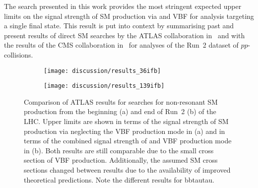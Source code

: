 The search presented in this work provides the most stringent expected
upper limits on the signal strength of SM \HH production via \ggF and
VBF for analysis targeting a single final state. This result is put
into context by summarising past and present results of direct SM \HH
searches by the ATLAS collaboration
in~ and with the results of the CMS
collaboration in~ for analyses of the Run~2
dataset of $pp$-collisions.

\begin{figure}[tbp]
  \centering

  \begin{subfigure}[b]{0.53\textwidth}
    \texttt{[image: discussion/results\_36ifb]}

    \label{fig:atlas_run2_36ifb}
  \end{subfigure}\hfill%
  \begin{subfigure}[b]{0.46\textwidth}
    \texttt{[image: discussion/results\_139ifb]}

    \label{fig:atlas_run2_139ifb}
  \end{subfigure}

  \caption{Comparison of ATLAS results for searches for non-resonant
    SM \HH production from the beginning (a) and end of Run~2 (b) of
    the LHC. Upper limits are shown in terms of the signal strength of
    SM \HH production via \ggF neglecting the VBF production mode in
    (a) and in terms of the combined signal strength of \ggF and VBF
    production mode in (b). Both results are still comparable due to
    the small cross section of VBF \HH production. Additionally, the
    assumed SM \HH cross sections changed between results due to the
    availability of improved theoretical predictions.  Note the
    different results for bbtautau. }
  \label{fig:atlas_run2_hh_results}
\end{figure}

\begin{table}[tbp]
  \centering


  \caption{Table of CMS results of searches for non-resonant
    production of Higgs boson pairs with an integrated luminosity of
    \SI{138}{\per\femto\barn}. Upper limits are shown at
    \SI{95}{\percent} CL on the signal strength of the combination of
    the \ggF and VBF production modes.}%
  \label{tab:cms_nonresonant}

  
\end{table}

